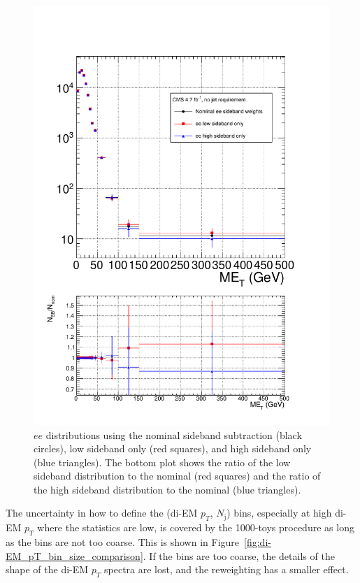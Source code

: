 \documentclass[dissertation.tex]{subfiles}
\begin{document}
\begin{figure}
	\centering
	\includegraphics[scale=0.4]{mee_bkg_shape_error}
	\caption{$ee$ \MET distributions using the nominal sideband subtraction (black circles), low sideband only (red squares), and high sideband only (blue triangles).  The bottom plot shows the ratio of the low sideband distribution to the nominal (red squares) and the ratio of the high sideband distribution to the nominal (blue triangles).}
	\label{fig:mee_bkg_shape_error}
\end{figure}

The uncertainty in how to define the (di-EM $p_{T}$, $N_{\mathrm{j}}$) bins, especially at high di-EM $p_{T}$ where the statistics are low, is covered by the 1000-toys procedure as long as the bins are not too coarse.  This is shown in Figure~\ref{fig:di-EM_pT_bin_size_comparison}.  If the bins are too coarse, the details of the shape of the di-EM $p_{T}$ spectra are lost, and the reweighting has a smaller effect.
\end{document}
